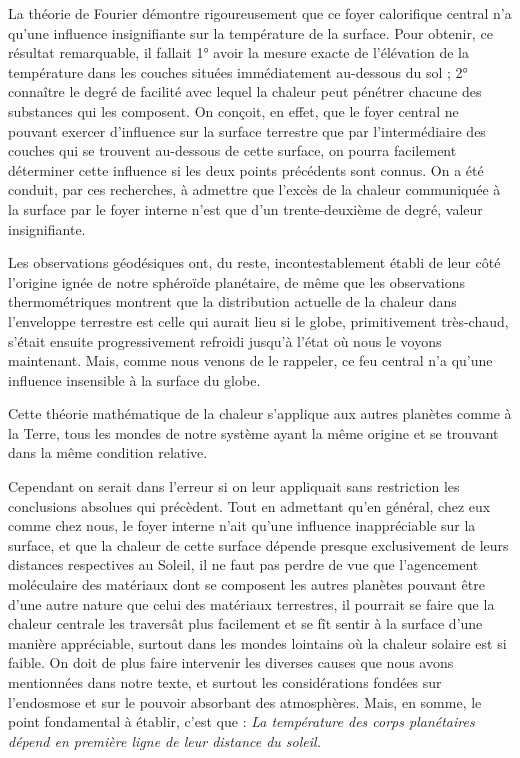 \documentclass[a4paper, 11pt, oneside]{article}
\begin{document}
La théorie de Fourier démontre rigoureusement que ce foyer calorifique central n'a qu'une influence insignifiante sur la température de la surface. Pour obtenir, ce résultat remarquable, il fallait 1° avoir la mesure exacte de l'élévation de la température dans les couches situées immédiatement au-dessous du sol ; 2° connaître le degré de facilité avec lequel la chaleur peut pénétrer chacune des substances qui les composent. On conçoit, en effet, que le foyer central ne pouvant exercer d'influence sur la surface terrestre que par l'intermédiaire des couches qui se trouvent au-dessous de cette surface, on pourra facilement déterminer cette influence si les deux points précédents sont connus. On a été conduit, par ces recherches, à admettre que l'excès de la chaleur communiquée à la surface par le foyer interne n'est que d'un trente-deuxième de degré, valeur insignifiante.

Les observations géodésiques ont, du reste, incontestablement établi de leur côté l'origine ignée de notre sphéroïde planétaire, de même que les observations thermométriques montrent que la distribution actuelle de la chaleur dans l'enveloppe terrestre est celle qui aurait lieu si le globe, primitivement très-chaud, s'était ensuite progressivement refroidi jusqu'à l'état où nous le voyons maintenant. Mais, comme nous venons de le rappeler, ce feu central n'a qu'une influence insensible à la surface du globe.

Cette théorie mathématique de la chaleur s'applique aux autres planètes comme à la Terre, tous les mondes de notre système ayant la même origine et se trouvant dans la même condition relative.

Cependant on serait dans l'erreur si on leur appliquait sans restriction les conclusions absolues qui précèdent. Tout en admettant qu'en général, chez eux comme chez nous, le foyer interne n'ait qu'une influence inappréciable sur la surface, et que la chaleur de cette surface dépende presque exclusivement de leurs distances respectives au Soleil, il ne faut pas perdre de vue que l'agencement moléculaire des matériaux dont se composent les autres planètes pouvant être d'une autre nature que celui des matériaux terrestres, il pourrait se faire que la chaleur centrale les traversât plus facilement et se fît sentir à la surface d'une manière appréciable, surtout dans les mondes lointains où la chaleur solaire est si faible. On doit de plus faire intervenir les diverses causes que nous avons mentionnées dans notre texte, et surtout les considérations fondées sur l'endosmose et sur le pouvoir absorbant des atmosphères. Mais, en somme, le point fondamental à établir, c'est que : \emph{La température des corps planétaires dépend en première ligne de leur distance du soleil.}
\end{document}
